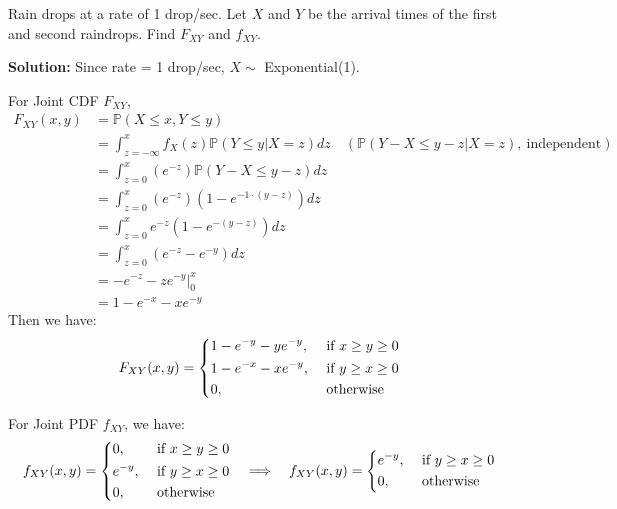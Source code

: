 \begin{eg}
    Rain drops at a rate of 1 drop/sec. Let \(X\) and \(Y\) be the arrival times of the first and second raindrops. Find \(F_{XY}\) and \(f_{XY}\). 

    \textbf{Solution:} 
    Since rate = 1 drop/sec, \(X \sim\) Exponential(1). 

    For Joint CDF \(F_{XY}\), 
    \[
    \begin{aligned}
        F_{XY}(x, y) &= \mathbb{P}(X \leq x, Y \leq y) \\
        &= \int_{z = -\infty}^{x} f_X(z) \mathbb{P}(Y \leq y \vert X = z) dz \quad (\mathbb{P}(Y - X \leq y - z \vert X = z),\ \text{independent})\\
        &= \int_{z = 0}^{x} (e^{-z}) \mathbb{P}(Y - X \leq y - z) dz \\
        &= \int_{z = 0}^{x} (e^{-z}) (1 - e^{-1 \cdot (y - z)}) dz \\
        &= \int_{z = 0}^{x} e^{-z}(1 - e^{-(y - z)}) dz \\
        &= \int_{z = 0}^{x} (e^{-z} - e^{-y}) dz \\
        &= - e^{-z} - ze^{-y} \Big|_0^x \\
        &= 1 - e^{-x} - xe^{-y}
    \end{aligned}
    \]
    Then we have: 
    \[
        F_{XY}(x, y) = \begin{dcases}
            1 - e^{-y} - ye^{-y}, &\text{ if } x \geq y \geq 0 \\
            1 - e^{-x} - xe^{-y}, &\text{ if } y \geq x \geq 0 \\
            0, &\text{ otherwise} 
        \end{dcases}
    \]

    For Joint PDF \(f_{XY}\), we have: 
    \[
        f_{XY}(x, y) = \begin{dcases}
            0, &\text{ if } x \geq y \geq 0 \\
            e^{-y}, &\text{ if } y \geq x \geq 0 \\
            0, &\text{ otherwise} 
        \end{dcases}
        \quad\Longrightarrow\quad 
        f_{XY}(x, y) = \begin{dcases}
            e^{-y}, &\text{ if } y \geq x \geq 0 \\
            0, &\text{ otherwise} 
        \end{dcases}
    \]
\end{eg}

